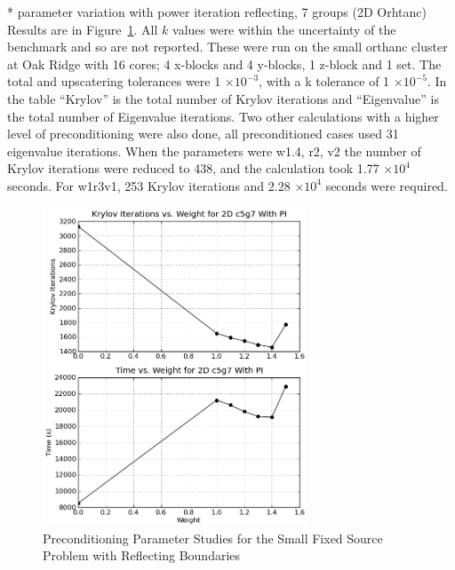 * parameter variation with power iteration reflecting, 7 groups (2D Orhtanc)
Results are in Figure~\ref{fig:2Dc5g7PI}. All $k$ values were within the uncertainty of the benchmark and so are not reported. These were run on the small orthanc cluster at Oak Ridge with 16 cores; 4 x-blocks and 4 y-blocks, 1 z-block and 1 set. The total and upscatering tolerances were 1 $\times 10^{-3}$, with a k tolerance of 1 $\times 10^{-5}$. In the table ``Krylov'' is the total number of Krylov iterations and ``Eigenvalue'' is the total number of Eigenvalue iterations. Two other calculations with a higher level of preconditioning were also done, all preconditioned cases used 31 eigenvalue iterations. When the parameters were w1.4, r2, v2 the number of Krylov iterations were reduced to 438, and the calculation took 1.77 $\times 10^{4}$ seconds. For w1r3v1, 253 Krylov iterations and 2.28 $\times 10^{4}$ seconds were required.
%
\begin{figure}[!ht]
    \begin{center}
      \includegraphics [width=0.7\textwidth, height=0.7\textheight] {2dc5g7PI}
   \end{center}
   \caption{Preconditioning Parameter Studies for the Small Fixed Source Problem with Reflecting Boundaries}
   \label{fig:2Dc5g7PI}
\end{figure}
 
